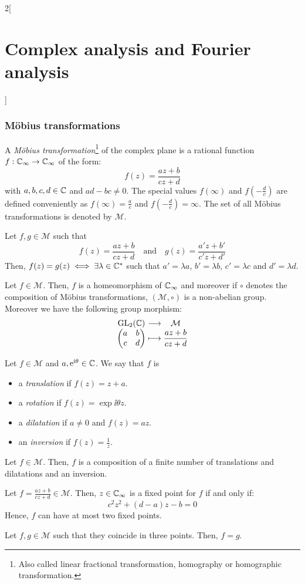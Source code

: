 \documentclass[../../../main.tex]{subfiles}
\begin{document}
\begin{multicols}{2}[\section{Complex analysis and Fourier analysis}]
  \subsubsection{Möbius transformations}
  \begin{definition}
    A \emph{Möbius transformation}\footnote{Also called linear fractional transformation, homography or homographic transformation.} of the complex plane is a rational function $f:\mathbb{C}_\infty\rightarrow\mathbb{C}_\infty$ of the form: $$f(z)=\frac{az+b}{cz+d}$$ with $a,b,c,d\in\mathbb{C}$ and $ad-bc\ne 0$. The special values $f(\infty)$ and $f\left(-\frac{d}{c}\right)$ are defined conveniently as $f(\infty)=\frac{a}{c}$ and $f\left(-\frac{d}{c}\right)=\infty$. The set of all Möbius transformations is denoted by $\mathcal{M}$.
  \end{definition}
  \begin{proposition}
    Let $f,g\in\mathcal{M}$ such that $$f(z)=\frac{az+b}{cz+d}\quad\text{and}\quad g(z)=\frac{a'z+b'}{c'z+d'}$$
    Then, $f(z)=g(z)\iff \exists\lambda\in\mathbb{C}^*$ such that $a'=\lambda a$, $b'=\lambda b$, $c'=\lambda c$ and $d'=\lambda d$.
  \end{proposition}
  \begin{proposition}
    Let $f\in\mathcal{M}$. Then, $f$ is a homeomorphism of $\mathbb{C}_\infty$ and moreover if $\circ$ denotes the composition of Möbius transformations, $(\mathcal{M},\circ)$ is a non-abelian group. Moreover we have the following group morphism:
    $$\function{}{\GL_2(\CC)}{\mathcal{M}}{\begin{pmatrix}
          a & b \\
          c & d
        \end{pmatrix}}{\displaystyle\frac{az+b}{cz+d}}$$
  \end{proposition}
  \begin{definition}
    Let $f\in\mathcal{M}$ and $a,\mathrm{e}^{\mathrm{i}\theta}\in\mathbb{C}$. We say that $f$ is
    \begin{itemize}
      \item a \emph{translation} if $f(z)=z+a$.
      \item a \emph{rotation} if $f(z)=\exp{\ii\theta}z$.
      \item a \emph{dilatation} if $a\ne 0$ and $f(z)=az$.
      \item an \emph{inversion} if $f(z)=\frac{1}{z}$.
    \end{itemize}
  \end{definition}
  \begin{theorem}
    Let $f\in\mathcal{M}$. Then, $f$ is a composition of a finite number of translations and dilatations and an inversion.
  \end{theorem}
  \begin{proposition}
    Let $f=\frac{az+b}{cz+d}\in\mathcal{M}$. Then, $z\in\mathbb{C}_\infty$ is a fixed point for $f$ if and only if: $$c^2z^2+(d-a)z-b=0$$
    Hence, $f$ can have at most two fixed points.
  \end{proposition}
  \begin{corollary}
    Let $f,g\in\mathcal{M}$ such that they coincide in three points. Then, $f=g$.
  \end{corollary}

\end{multicols}
\end{document}
